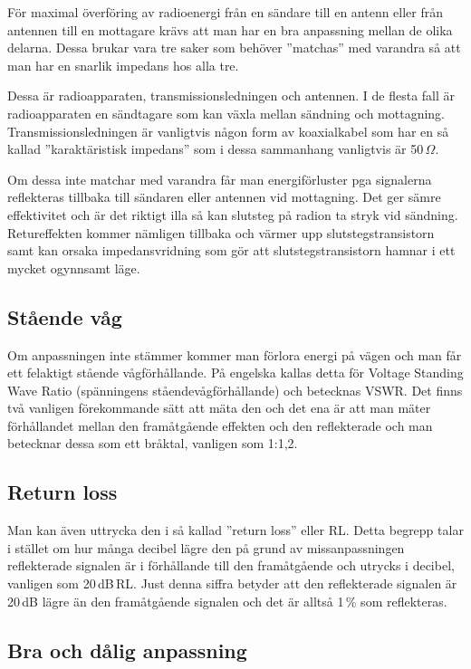 För maximal överföring av radioenergi från en sändare till en antenn eller
från antennen till en mottagare krävs att man har en bra anpassning mellan de
olika delarna. Dessa brukar vara tre saker som behöver ''matchas'' med
varandra så att man har en snarlik impedans hos alla tre.

Dessa är radioapparaten, transmissionsledningen och antennen. I de flesta fall
är radioapparaten en sändtagare som kan växla mellan sändning och mottagning.
Transmissionsledningen är vanligtvis någon form av koaxialkabel som har en så
kallad ''karaktäristisk impedans'' som i dessa sammanhang vanligtvis är
50\,$\Omega$.

Om dessa inte matchar med varandra får man energiförluster pga signalerna
reflekteras tillbaka till sändaren eller antennen vid mottagning. Det ger
sämre effektivitet och är det riktigt illa så kan slutsteg på radion ta stryk
vid sändning. Retureffekten kommer nämligen tillbaka och värmer upp
slutstegstransistorn samt kan orsaka impedansvridning som gör att
slutstegstransistorn hamnar i ett mycket ogynnsamt läge.

\subsection{Stående våg}

Om anpassningen inte stämmer kommer man förlora energi på vägen och man får
ett felaktigt stående vågförhållande. På engelska kallas detta för Voltage
Standing Wave Ratio (spänningens ståendevågförhållande) och betecknas VSWR.
Det finns två vanligen förekommande sätt att mäta den och det ena är att man
mäter förhållandet mellan den framåtgående effekten och den reflekterade och
man betecknar dessa som ett bråktal, vanligen som 1:1,2.

\subsection{Return loss}

Man kan även uttrycka den i så kallad ''return loss'' eller RL. Detta begrepp
talar i stället om hur många decibel lägre den på grund av missanpassningen
reflekterade signalen är i förhållande till den framåtgående och utrycks i
decibel, vanligen som 20\,dB\,RL. Just denna siffra betyder att den
reflekterade signalen är 20\,dB lägre än den framåtgående signalen och det är
alltså 1\,\% som reflekteras.

\subsection{Bra och dålig anpassning}

